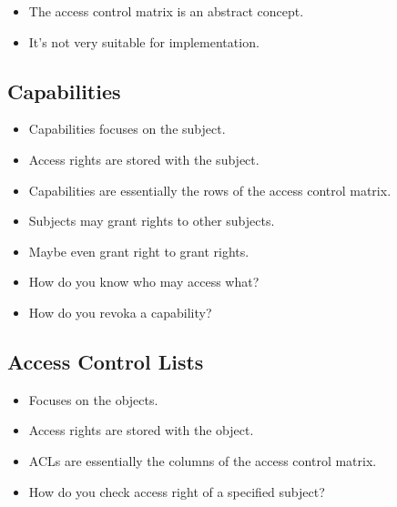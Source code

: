 \documentclass{beamer}
\begin{document}
\begin{frame}{\insertsubsectionhead}
  \begin{itemize}
    \item The access control matrix is an abstract concept.
    \item It's not very suitable for implementation.
  \end{itemize}
\end{frame}

\subsection{Capabilities}

\begin{frame}{\insertsubsectionhead}
  \begin{itemize}
    \item Capabilities focuses on the subject.
    \item Access rights are stored with the subject.
    \item Capabilities are essentially the rows of the access control matrix.
    \item Subjects may grant rights to other subjects.
    \item Maybe even grant right to grant rights.

    \item How do you know who may access what?
    \item How do you revoka a capability?
  \end{itemize}
\end{frame}

\subsection{Access Control Lists}

\begin{frame}{\insertsubsectionhead}
  \begin{itemize}
    \item Focuses on the objects.
    \item Access rights are stored with the object.
    \item ACLs are essentially the columns of the access control matrix.

    \item How do you check access right of a specified subject?
  \end{itemize}
\end{frame}
\end{document}
